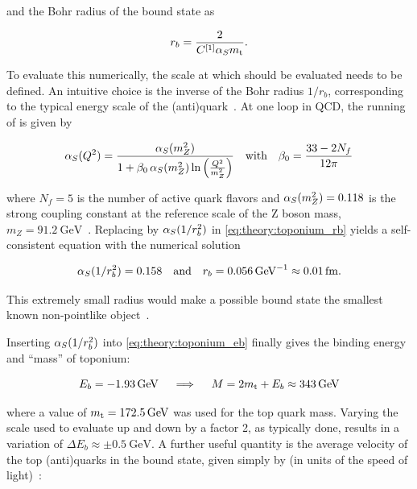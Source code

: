 \noindent and the Bohr radius of the bound state as

\begin{equation}
\label{eq:theory:toponium_rb}
  r_b = \frac{2} {C^{[1]} \alpha_S m_{\mathrm{t}}} .
\end{equation}

To evaluate this numerically, the scale at which \alphas should be evaluated needs to be defined. An intuitive choice is the inverse of the Bohr radius $1/r_b$, corresponding to the typical energy scale of the (anti)quark~\cite{Kiyo:2008bv,Maltoni:LHCTopWG}. At one loop in QCD, the running of \alphas is given by~\cite{Schwartz:2014sze}

\begin{equation}
  \alpha_S (Q^2) = \frac{\alpha_S(m_Z^2)}{ 1 + \beta_0 \, \alpha_S(m_Z^2) \ln \left( \frac{Q^2}{m_Z^2} \right)} \quad \text{with} \quad \beta_0 = \frac{33 - 2 N_f}{12 \pi}
\end{equation}

\noindent where $N_f = 5$ is the number of active quark flavors and $\alpha_S(m_Z^2) = 0.118$ is the strong coupling constant at the reference scale of the Z boson mass, $m_Z = \SI{91.2}{\GeV}$~\cite{PDG:2022pth}.
Replacing \alphas by $\alpha_S(1/r_b^2)$ in \cref{eq:theory:toponium_rb} yields a self-consistent equation with the numerical solution

\begin{equation}
\label{eq:theory:alphas_toponium}
  \alphas(1/r_b^2) = 0.158 \quad \text{and} \quad r_b = \SI{0.056}{\per\GeV} \approx \SI{0.01}{\femto\meter} .
\end{equation}

This extremely small radius would make a possible \ttbar bound state the smallest known non-pointlike object~\cite{Fu:2025yft}.

Inserting $\alpha_S(1/r_b^2)$ into \cref{eq:theory:toponium_eb} finally gives the binding energy and ``mass'' of toponium:

\begin{equation}
\label{eq:theory:toponium_eb_num}
  E_b = - \SI{1.93}{\GeV} \quad \implies \quad M = 2 \mt + E_b \approx \SI{343}{\GeV}
\end{equation}

\noindent where a value of $\mt = \SI{172.5}{\GeV}$ was used for the top quark mass. Varying the scale used to evaluate \alphas up and down by a factor 2, as typically done, results in a variation of $\Delta E_b \approx \pm\SI{0.5}{\GeV}$. A further useful quantity is the average velocity of the top (anti)quarks in the bound state, given simply by (in units of the speed of light)~\cite{Maltoni:LHCTopWG}:

